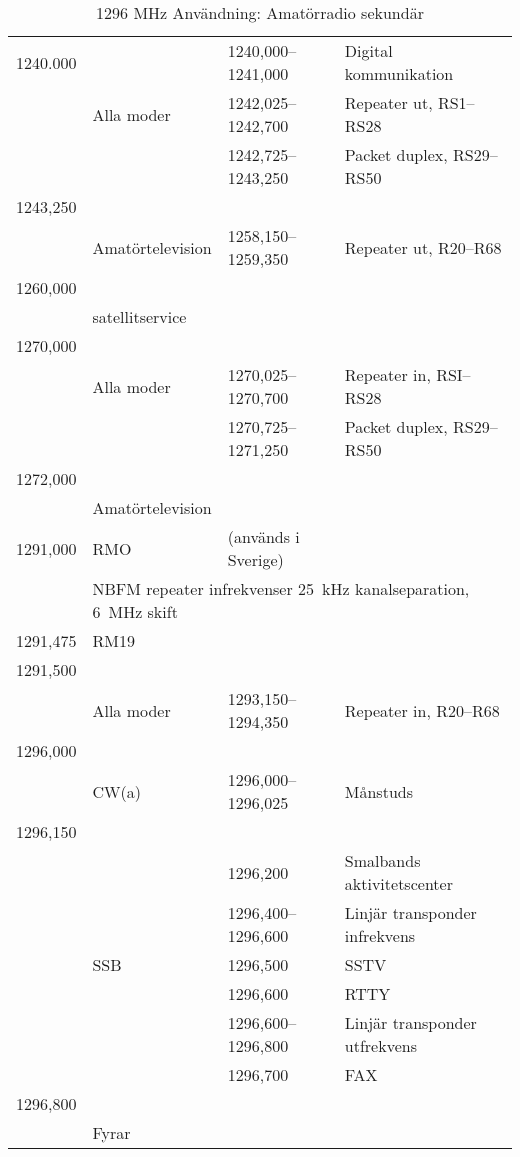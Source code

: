 \setlongtables
\begin{longtable}{llll}
\caption{1296 MHz Användning: Amatörradio sekundär} \\

1240.000 &            & 1240,000--1241,000 & Digital kommunikation \\
         & Alla moder & 1242,025--1242,700 & Repeater ut, RS1--RS28 \\
         &            & 1242,725--1243,250 & Packet duplex, RS29--RS50 \\
1243,250 & & & \\
         & Amatörtelevision & 1258,150--1259,350 & Repeater ut, R20--R68 \\
1260,000 & & & \\
         & satellitservice & & \\
1270,000 & & & \\
         & Alla moder & 1270,025--1270,700 & Repeater in, RSI--RS28 \\
         &            & 1270,725--1271,250 & Packet duplex, RS29--RS50 \\
1272,000 & & & \\
         & Amatörtelevision & & \\
1291,000 & RMO        & (används i Sverige) & \\
         & \multicolumn{3}{l}{NBFM repeater infrekvenser 25~kHz kanalseparation, 6~MHz skift} \\
1291,475 & RM19 & & \\
1291,500 & & & \\
         & Alla moder & 1293,150--1294,350 & Repeater in, R20--R68 \\
1296,000 & & & \\
         & CW(a) & 1296,000--1296,025 & Månstuds \\
1296,150 & & & \\
         &     & 1296,200           & Smalbands aktivitetscenter \\
         &     & 1296,400--1296,600 & Linjär transponder infrekvens \\
         & SSB & 1296,500           & SSTV \\
         &     & 1296,600           & RTTY \\
         &     & 1296,600--1296,800 & Linjär transponder utfrekvens \\
         &     & 1296,700           & FAX \\
1296,800 & & & \\
         & Fyrar & & \\

\end{longtable}
